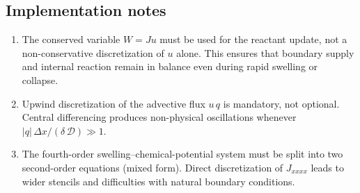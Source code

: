\documentclass[aps,pre,reprint,superscriptaddress,longbibliography,floatfix]{revtex4-2}
\newcommand{\Ds}{\mathcal{D}}
\begin{document}
\subsection{Implementation notes}

\begin{enumerate}
  \item The conserved variable $W = Ju$ must be used for the reactant update, not a non-conservative discretization of $u$ alone. This ensures that boundary supply and internal reaction remain in balance even during rapid swelling or collapse.
  \item Upwind discretization of the advective flux $u\,q$ is mandatory, not optional. Central differencing produces non-physical oscillations whenever $|q|\,\Delta x / (\delta\,\Ds) \gg 1$.
  \item The fourth-order swelling--chemical-potential system must be split into two second-order equations (mixed form). Direct discretization of $J_{xxxx}$ leads to wider stencils and difficulties with natural boundary conditions.
\end{enumerate}
\end{document}

